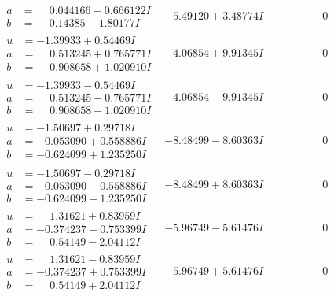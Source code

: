 \documentclass[1p]{elsarticle_modified}
\theoremstyle{definition}
\begin{document}
$$\begin{array}{c|c|c}
\begin{aligned}
a &= \phantom{-}0.044166 - 0.666122 I \\
b &= \phantom{-}0.14385 - 1.80177 I\end{aligned}
 & -5.49120 + 3.48774 I & \phantom{-0.000000 } 0 \\ \hline\begin{aligned}
u &= -1.39933 + 0.54469 I \\
a &= \phantom{-}0.513245 + 0.765771 I \\
b &= \phantom{-}0.908658 + 1.020910 I\end{aligned}
 & -4.06854 + 9.91345 I & \phantom{-0.000000 } 0 \\ \hline\begin{aligned}
u &= -1.39933 - 0.54469 I \\
a &= \phantom{-}0.513245 - 0.765771 I \\
b &= \phantom{-}0.908658 - 1.020910 I\end{aligned}
 & -4.06854 - 9.91345 I & \phantom{-0.000000 } 0 \\ \hline\begin{aligned}
u &= -1.50697 + 0.29718 I \\
a &= -0.053090 + 0.558886 I \\
b &= -0.624099 + 1.235250 I\end{aligned}
 & -8.48499 - 8.60363 I & \phantom{-0.000000 } 0 \\ \hline\begin{aligned}
u &= -1.50697 - 0.29718 I \\
a &= -0.053090 - 0.558886 I \\
b &= -0.624099 - 1.235250 I\end{aligned}
 & -8.48499 + 8.60363 I & \phantom{-0.000000 } 0 \\ \hline\begin{aligned}
u &= \phantom{-}1.31621 + 0.83959 I \\
a &= -0.374237 - 0.753399 I \\
b &= \phantom{-}0.54149 - 2.04112 I\end{aligned}
 & -5.96749 - 5.61476 I & \phantom{-0.000000 } 0 \\ \hline\begin{aligned}
u &= \phantom{-}1.31621 - 0.83959 I \\
a &= -0.374237 + 0.753399 I \\
b &= \phantom{-}0.54149 + 2.04112 I\end{aligned}
 & -5.96749 + 5.61476 I & \phantom{-0.000000 } 0 \\ \hline\begin{aligned}

\end{aligned}
\end{array}$$
\end{document}

